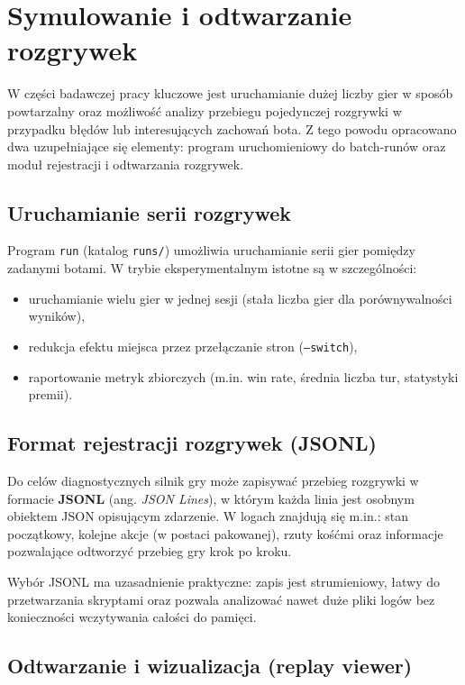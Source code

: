 \documentclass[polish,inz,longabstract]{iithesis}
\begin{document}
\chapter{Symulowanie i odtwarzanie rozgrywek}

W części badawczej pracy kluczowe jest uruchamianie dużej liczby gier w sposób powtarzalny oraz możliwość analizy przebiegu pojedynczej rozgrywki w przypadku błędów lub interesujących zachowań bota. Z tego powodu opracowano dwa uzupełniające się elementy: program uruchomieniowy do batch-runów oraz moduł rejestracji i odtwarzania rozgrywek.

\section{Uruchamianie serii rozgrywek}

Program \texttt{run} (katalog \texttt{runs/}) umożliwia uruchamianie serii gier pomiędzy zadanymi botami. W trybie eksperymentalnym istotne są w szczególności:

\begin{itemize}
\item uruchamianie wielu gier w jednej sesji (stała liczba gier dla porównywalności wyników),
\item redukcja efektu miejsca przez przełączanie stron (\texttt{--switch}),
\item raportowanie metryk zbiorczych (m.in. win rate, średnia liczba tur, statystyki premii).
\end{itemize}

\section{Format rejestracji rozgrywek (JSONL)}

Do celów diagnostycznych silnik gry może zapisywać przebieg rozgrywki w formacie \textbf{JSONL} (ang. \textit{JSON Lines}), w którym każda linia jest osobnym obiektem JSON opisującym zdarzenie. W logach znajdują się m.in.: stan początkowy, kolejne akcje (w postaci pakowanej), rzuty kośćmi oraz informacje pozwalające odtworzyć przebieg gry krok po kroku.

Wybór JSONL ma uzasadnienie praktyczne: zapis jest strumieniowy, łatwy do przetwarzania skryptami oraz pozwala analizować nawet duże pliki logów bez konieczności wczytywania całości do pamięci.

\section{Odtwarzanie i wizualizacja (replay viewer)}
\end{document}
